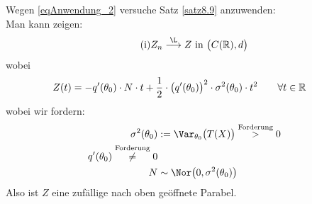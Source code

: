 Wegen \eqref{eqAnwendung_2} versuche Satz \ref{satz8.9} anzuwenden:\\
Man kann zeigen:
\begin{align}\label{eqAnwendung_i}\tag{i}
	Z_n\overset{\L}{\longrightarrow} Z\text{ in }\big(C(\R),d\big)
\end{align}
wobei
\begin{align*}
	Z(t)
	&=-q'(\theta_0)\cdot N\cdot t+\frac{1}{2}\cdot\big(q'(\theta_0)\big)^2\cdot\sigma^2(\theta_0)\cdot t^2 \qquad\forall t\in\mathbb{R}
\end{align*}
wobei wir fordern:
\begin{align*}
	\sigma^2(\theta_0)&:=\Var_{\theta_0}\big(T(X)\big)\overset{\text{Forderung}}>0\\
	q'(\theta_0)\overset{\text{Forderung}}\neq0\\
	N&\sim\Nor\big(0,\sigma^2(\theta_0)\big)
\end{align*}
Also ist $Z$ eine zufällige nach oben geöffnete Parabel.


